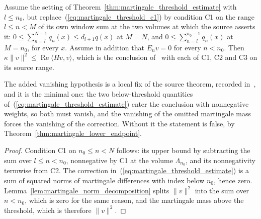 \begin{theorem}
    \label{thm:martingale_below_threshold_estimate}
    \leanok
    Assume the setting of Theorem~\ref{thm:martingale_threshold_estimate} with
    $l\le n_0$, but replace~(\ref{eq:martingale_threshold_c1}) by condition C1 on the range
    $l\le n<M$ of its own window sum at the two volumes at which the source asserts it:
    $0\le\sum_{n=l}^{N-1}q_n(x)\le d_{l+1}q(x)$ at $M=N$, and
    $0\le\sum_{n=l}^{n_0-1}q_n(x)$ at $M=n_0$, for every $x$. Assume
    in addition that $E_nv=0$ for every $n<n_0$. Then
    $\kappa\lVert v\rVert^2\le\operatorname{Re}\langle Hv,v\rangle$, which is the
    conclusion of~\cite[Theorem~2.1(i), lines 1119--1130]{Nachtergaele1996Spectral} with
    each of C1, C2 and C3 on its source range.

    The added vanishing hypothesis is a local fix of the source theorem, recorded
    in~\cite{gap:nachtergaele96_theorem_2_1_lower_endpoint}, and it is the minimal one:
    the two below-threshold quantities of~(\ref{eq:martingale_threshold_estimate}) enter
    the conclusion with nonnegative weights, so both must vanish, and the vanishing of
    the omitted martingale mass forces the vanishing of the correction. Without it the
    statement is false, by Theorem~\ref{thm:martingale_lower_endpoint}.
\end{theorem}
\begin{proof}\leanok
    Condition C1 on $n_0\le n<N$ follows: its upper bound by subtracting the sum over
    $l\le n<n_0$, nonnegative by C1 at the volume $\Lambda_{n_0}$, and its nonnegativity
    termwise from C2. The correction in~(\ref{eq:martingale_threshold_estimate}) is a
    sum of squared norms of martingale differences with index below $n_0$, hence zero.
    Lemma~\ref{lem:martingale_norm_decomposition} splits $\lVert v\rVert^2$ into the sum
    over $n<n_0$, which is zero for the same reason, and the martingale mass above the
    threshold, which is therefore $\lVert v\rVert^2$.
\end{proof}


